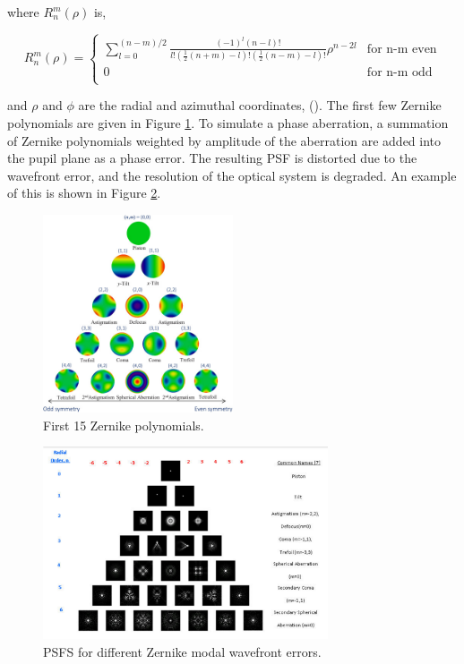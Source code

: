 where $R_n^m(\rho)$ is,

\[ 
R_n^m(\rho)= \left\{
\begin{array}{cr}
       {\sum_{l=0}^{(n-m)/2} \frac{(-1)^l(n-l)!}{l!(\frac{1}{2}(n+m)-l)!(\frac{1}{2}(n-m)-l)!}\rho^{n-2l}} &  \mbox{for n-m even} \\
        {0} &  \mbox{for n-m odd} \\
\end{array} 
\right. 
\]

and $\rho$ and $\phi$ are the radial and azimuthal coordinates, (\cite{weisstein2002zernike}). The first few Zernike polynomials are given in Figure \ref{fig:zernikes}. To simulate a phase aberration, a summation of Zernike polynomials weighted by amplitude of the aberration are added into the pupil plane as a phase error. The resulting PSF is distorted due to the wavefront error, and the resolution of the optical system is degraded. An example of this is shown in Figure \ref{fig:zernikePSFs}.

\begin{figure}[h]
    \centering
    \includegraphics[width=0.5\textwidth]{Chapter Materials/Introduction Materials/Introduction Figures/zernikes.jpeg}
    \caption{First 15 Zernike polynomials. \cite{Hsieh:20}}
    \label{fig:zernikes}
\end{figure}


\begin{figure}
    \centering
    \includegraphics[width=0.75\textwidth]{Chapter Materials/Introduction Materials/Introduction Figures/ZernikePSFs.png}
    \caption{PSFS for different Zernike modal wavefront errors. \cite{masalehdan2010modeling}}
    \label{fig:zernikePSFs}
\end{figure}


